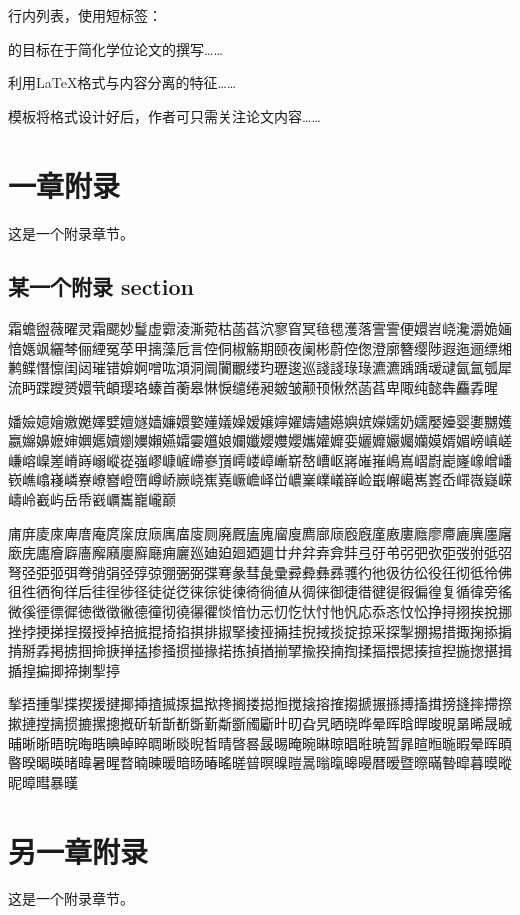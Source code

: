 \documentclass[
  fontset = mac,
]{shtthesis}
\begin{document}
行内列表，使用短标签：
\begin{enumerate*}[a)]
  \item \shtthesis 的目标在于简化学位论文的撰写……
  \item \shtthesis 利用\LaTeX{}格式与内容分离的特征……
  \item \shtthesis 模板将格式设计好后，作者可只需关注论文内容……
\end{enumerate*}

\makebiblio

\appendix
\chapter{一章附录}
这是一个附录章节。

\section{某一个附录 section}
{\songti 霜蟾盥薇曜灵霜颸妙鬘虚霩淩澌菀枯菡萏泬寥窅冥毰毸濩落霅霅便嬛岧峣瀺灂姽婳愔嫕飒纚棽俪緸冤莩甲摛藻卮言倥侗椒觞期颐夜阑彬蔚倥偬澄廓簪缨陟遐迤逦缥缃鹣鲽憯懔闺闼璀错媕婀噌吰澒洞阛闠覼缕玓瓑逡巡諓諓琭琭瀌瀌踽踽叆叇氤氲瓠犀流眄蹀躞赟嬛茕頔璎珞螓首蘅皋惏悷缱绻昶皴皱颟顸愀然菡萏卑陬纯懿犇麤掱暒}

{\heiti 嬏嬐嬑嬒嬓嬔嬕嬖嬗嬘嫱嬚嬛嬜嬞嬟嬠嫒嬢嬣嬥嬦嬧嬨嬩嫔嬫嬬奶嬬嬮嬯婴嬱嬲嬳嬴嬵嬶嬷婶嬹嬺嬻嬼嬽嬾嬿孀孁孂娘孄孅孆孇孆孈孉孊娈孋孊孍孎孏嫫婿媚嵭嵮嵯嵰嵱嵲嵳嵴嵵嵶嵷嵸嵹嵺嵻嵼嵽嵾嵿嶀嵝嶂嶃崭嶅嶆岖嶈嶉嶊嶋嶌嶍嶎嶏嶐嶑嶒嶓嵚嶕嶖嶘嶙嶚嶛嶜嶝嶞嶟峤嶡峣嶣嶤嶥嶦峄峃嶩嶪嶫嶬嶭崄嶯嶰嶱嶲嶳岙嶵嶶嶷嵘嶹岭嶻屿岳帋巀巁巂巃巄巅}

{\kaishu 庯庰庱庲庳庴庵庹庺庻庼庽庿廀厕廃厩廅廆廇廋廌廍庼廏廐廑廒廔廕廖廗廘廙廛廜廞庑廤廥廦廧廨廭廮廯廰痈廲廵廸廹廻廼廽廿弁弅弆弇弉弖弙弚弜弝弞弡弢弣弤弨弩弪弫弬弭弮弰弲弪弴弶弸弻弼弽弿彖彗彘彚彛彜彝彞彟彴彵彶彷彸役彺彻彽彾佛徂徃徆徇徉后徍徎徏径徒従徔徕徖徙徚徛徜徝从徟徕御徢徣徤徥徦徧徨复循徫旁徭微徯徰徱徲徳徴徵徶德徸彻徺忁忂惔愔忇忈忉忔忕忖忚忛応忝忞忟忪挣挦挧挨挩挪挫挬挭挮挰掇授掉掊掋掍掎掐掑排掓掔掕挜掚挂掜掝掞掟掠采探掣掤掦措掫掬掭掮掯掰掱掲掳掴掵掶掸掹掺掻掼掽掾掿拣揁揂揃揅揄揆揇揈揉揊揋揌揍揎揑揓揔揕揖揗揘揙揤揥揦揧揨}

{\fangsong 揫捂揰揱揲揳援揵揶揷揸揻揼揾揿搀搁搂搃搄搅搇搈搉搊搋搌搎搏搐搑搒摓摔摕摖摗摙摚摛掼摝摞摠摡斫斩斮斱斲斳斴斵斶斸旪旫旮旯晒晓晔晕晖晗晘晙晛晜晞晟晠晡晰晣晤晥晦晧晪晫晬晭晰晱晲晳晴晵晷晸晹晻晼晽晾晿暀暁暂暃暄暅暆暇晕晖暊暋暌暍暎暏暐暑暒暓暔暕暖暗旸暙暚暛暜暝暞暟暠暡暣暤暥暦暧暨暩暪暬暭暮暯暰昵暲暳暴暵}

\chapter{另一章附录}
这是一个附录章节。
\end{document}
